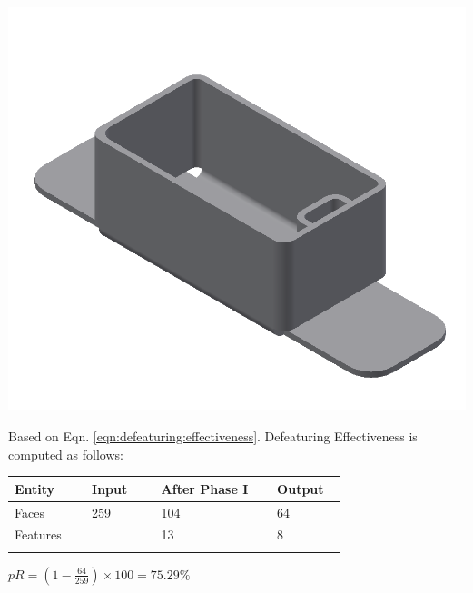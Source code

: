 \begin{minipage}{\linewidth}
\begin{minipage}[c]{0.62\linewidth}
\includegraphics[width=\linewidth,valign=t]{../Common/images/SheetMetal_Medium_Enclosure_DefeaturedPart}
 \label{fig:results:deft}


Based on Eqn. \ref{eqn:defeaturing:effectiveness}. Defeaturing Effectiveness is computed as follows:

\begin{longtable}[h]{@{} p{0.2\linewidth} p{0.18\linewidth} p{0.3\linewidth} p{0.18\linewidth} @{}}\toprule
\textbf{Entity} & \textbf{Input} & \textbf{After Phase I} & \textbf{Output}\\  \midrule
Faces  & 259 & 104 & 64\\
Features  &  &13 & 8\\
\bottomrule
\label{tbl:fig:defeat}
\end{longtable}

$pR = (1 - \frac{64}{259}) \times 100 = 75.29\%$


\end{minipage}
\end{minipage}
